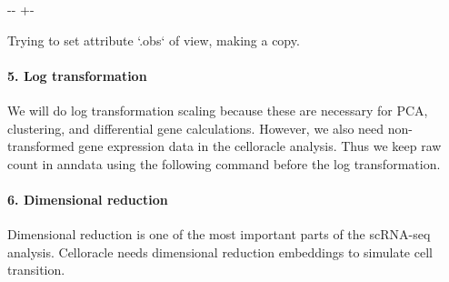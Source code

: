 \documentclass[letterpaper,10pt,english]{sphinxmanual}
\newlength\nbsphinxcodecellspacing
\begin{document}
{

\kern-\sphinxverbatimsmallskipamount\kern-\baselineskip
\kern+\FrameHeightAdjust\kern-\fboxrule
\vspace{\nbsphinxcodecellspacing}

\begin{sphinxVerbatim}[commandchars=\\\{\}]
Trying to set attribute `.obs` of view, making a copy.
\end{sphinxVerbatim}
}


\paragraph{5. Log transformation}
\label{\detokenize{notebooks/03_scRNA-seq_data_preprocessing/scanpy_preprocessing_with_Paul_etal_2015_data:5.-Log-transformation}}
We will do log transformation scaling because these are necessary for PCA, clustering, and differential gene calculations. However, we also need non-transformed gene expression data in the celloracle analysis. Thus we keep raw count in anndata using the following command before the log transformation.

{
\begin{sphinxVerbatim}[commandchars=\\\{\}]
\llap{\color{nbsphinxin}[7]:\,\hspace{\fboxrule}\hspace{\fboxsep}}
  

\end{sphinxVerbatim}
}


\paragraph{6. Dimensional reduction}
\label{\detokenize{notebooks/03_scRNA-seq_data_preprocessing/scanpy_preprocessing_with_Paul_etal_2015_data:6.-Dimensional-reduction}}
Dimensional reduction is one of the most important parts of the scRNA-seq analysis. Celloracle needs dimensional reduction embeddings to simulate cell transition.
\end{document}
